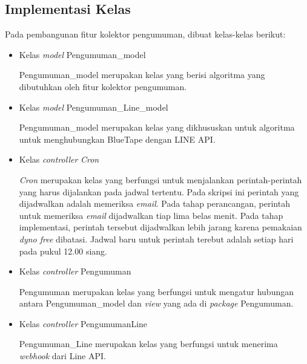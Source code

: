 \subsection{Implementasi Kelas}
Pada pembangunan fitur kolektor pengumuman, dibuat kelas-kelas berikut: 
\begin{itemize}
\item Kelas \textit{model} Pengumuman\_model

Pengumuman\_model merupakan kelas yang berisi algoritma yang dibutuhkan oleh fitur kolektor pengumuman.

\item Kelas \textit{model} Pengumuman\_Line\_model

Pengumuman\_model merupakan kelas yang dikhususkan untuk algoritma untuk menghubungkan BlueTape dengan LINE API.

\item Kelas \textit{controller} \textit{Cron}

\textit{Cron} merupakan kelas yang berfungsi untuk menjalankan perintah-perintah yang harus dijalankan pada jadwal tertentu. Pada skripsi ini perintah yang dijadwalkan adalah memeriksa \textit{email}. Pada tahap perancangan, perintah untuk memeriksa \textit{email} dijadwalkan tiap lima belas menit. Pada tahap implementasi, perintah tersebut dijadwalkan lebih jarang karena pemakaian \textit{dyno free} dibatasi. Jadwal baru untuk perintah terebut adalah setiap hari pada pukul 12.00 siang.

\item Kelas \textit{controller} Pengumuman

Pengumuman merupakan kelas yang berfungsi untuk mengatur hubungan antara Pengumuman\_model dan \textit{view} yang ada di \textit{package} Pengumuman.

\item Kelas \textit{controller} PengumumanLine

Pengumuman\_Line merupakan kelas yang berfungsi untuk menerima \textit{webhook} dari Line API.

\end{itemize}

